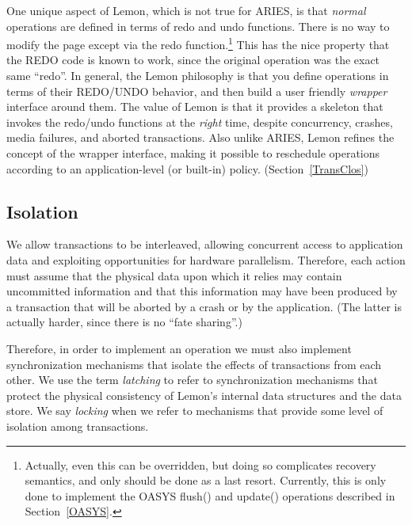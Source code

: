 \documentclass[letterpaper,twocolumn,english]{article}
\newcommand{\yad}{Lemon\xspace}
\begin{document}
One unique aspect of \yad, which is not true for ARIES, is that {\em
normal} operations are defined in terms of redo and undo
functions. There is no way to modify the page except via the redo
function.\footnote{Actually, even this can be overridden, but doing so
complicates recovery semantics, and only should be done as a last
resort.  Currently, this is only done to implement the OASYS flush()
and update() operations described in Section~\ref{OASYS}.}  This has
the nice property that the REDO code is known to work, since the
original operation was the exact same ``redo''.  In general, the \yad
philosophy is that you define operations in terms of their REDO/UNDO
behavior, and then build a user friendly {\em wrapper} interface around them.  The
value of \yad is that it provides a skeleton that invokes the
redo/undo functions at the {\em right} time, despite concurrency, crashes,
media failures, and aborted transactions.  Also unlike ARIES, \yad refines
the concept of the wrapper interface, making it possible to 
reschedule operations according to an application-level (or built-in) 
policy. (Section~\ref{TransClos})


\subsection{Isolation\label{Isolation}}

We allow transactions to be interleaved, allowing concurrent access to
application data and exploiting opportunities for hardware
parallelism.  Therefore, each action must assume that the
physical data upon which it relies may contain uncommitted
information and that this information may have been produced by a
transaction that will be aborted by a crash or by the application.
(The latter is actually harder, since there is no ``fate sharing''.)


Therefore, in order to implement an operation we must also implement
synchronization mechanisms that isolate the effects of transactions
from each other.  We use the term {\em latching} to refer to
synchronization mechanisms that protect the physical consistency of
\yad's internal data structures and the data store.  We say {\em
locking} when we refer to mechanisms that provide some level of
isolation among transactions.  
\end{document}
